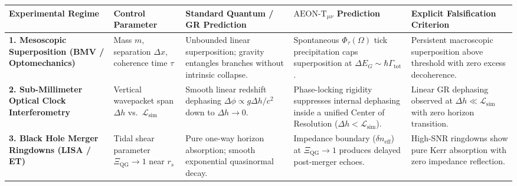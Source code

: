 \documentclass[
]{article}
\newcounter{none} %
\begin{document}
{\def\LTcaptype{none} %
\begin{longtable}[]{@{}
  >{\raggedright\arraybackslash}p{}
  >{\raggedright\arraybackslash}p{}
  >{\raggedright\arraybackslash}p{}
  >{\raggedright\arraybackslash}p{}
  >{\raggedright\arraybackslash}p{}@{}}
\toprule\noalign{}
\begin{minipage}[b]{\linewidth}\raggedright
Experimental Regime
\end{minipage} & \begin{minipage}[b]{\linewidth}\raggedright
Control Parameter
\end{minipage} & \begin{minipage}[b]{\linewidth}\raggedright
Standard Quantum / GR Prediction
\end{minipage} & \begin{minipage}[b]{\linewidth}\raggedright
\(\text{AEON-T}_{\mu\nu}\) Prediction
\end{minipage} & \begin{minipage}[b]{\linewidth}\raggedright
Explicit Falsification Criterion
\end{minipage} \\
\midrule\noalign{}
\endhead
\bottomrule\noalign{}
\endlastfoot
\textbf{1. Mesoscopic Superposition (BMV / Optomechanics)} & Mass \(m\),
separation \(\Delta x\), coherence time \(\tau\) & Unbounded linear
superposition; gravity entangles branches without intrinsic collapse. &
Spontaneous \(\Phi_\tau(\Omega)\) tick precipitation caps superposition
at \(\Delta E_G \sim \hbar\Gamma_{\mathrm{tot}}\). & Persistent
macroscopic superposition above threshold with zero excess
decoherence. \\
\textbf{2. Sub-Millimeter Optical Clock Interferometry} & Vertical
wavepacket span \(\Delta h\) vs.~\(\mathcal{L}_{\mathrm{sim}}\) & Smooth
linear redshift dephasing \(\Delta\phi \propto g\Delta h/c^2\) down to
\(\Delta h \to 0\). & Phase-locking rigidity suppresses internal
dephasing inside a unified Center of Resolution
(\(\Delta h < \mathcal{L}_{\mathrm{sim}}\)). & Linear GR dephasing
observed at \(\Delta h \ll \mathcal{L}_{\mathrm{sim}}\) with zero
horizon transition. \\
\textbf{3. Black Hole Merger Ringdowns (LISA / ET)} & Tidal shear
parameter \(\Xi_{\mathrm{QG}} \to 1\) near \(r_s\) & Pure one-way
horizon absorption; smooth exponential quasinormal decay. & Impedance
boundary (\(\delta n_{\mathrm{eff}}\)) at \(\Xi_{\mathrm{QG}} \to 1\)
produces delayed post-merger echoes. & High-SNR ringdowns show pure Kerr
absorption with zero impedance reflection. \\
\end{longtable}
}
\end{document}
